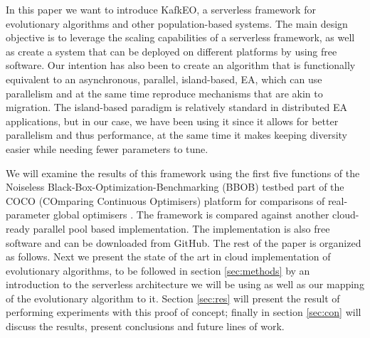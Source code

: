 \documentclass{llncs}
\begin{document}
  In this paper we want to introduce KafkEO, a serverless framework for
  evolutionary algorithms and other population-based systems. The main
  design objective is to leverage the scaling capabilities of a
  serverless framework, as well as create a system that can be deployed
  on different platforms by using free software. Our intention has
  also been to create an algorithm that is functionally equivalent to an
   asynchronous, parallel, island-based, EA, which can use parallelism and at the same
  time reproduce mechanisms that are akin to migration. The island-based 
  paradigm is relatively standard in distributed EA applications, but in our case, 
  we have been using it since it allows for better parallelism
  and thus performance, at the same time it makes keeping diversity
  easier while needing fewer parameters to tune.

  We will examine the results of this framework using the first five
  functions of the Noiseless Black-Box-Optimization-Benchmarking (BBOB) testbed \cite{hansen2016coco} part of the COCO (COmparing Continuous Optimisers) platform for comparisons of real-parameter global optimisers \cite{hansen2016coco}. The framework is compared
  against another cloud-ready parallel pool based implementation.
  The
  implementation is also free software and can be downloaded from
  GitHub.
  The rest of the paper is organized as follows. Next we present the
  state of the art in cloud implementation of evolutionary algorithms,
  to be followed in section \ref{sec:methods} by an introduction to the
  serverless architecture we will be using as well as our mapping of the
  evolutionary algorithm to it. Section \ref{sec:res} will present the
  result of performing experiments with this proof of concept; finally
  in section \ref{sec:con} will discuss the results, present conclusions
  and future lines of work.
\end{document}
